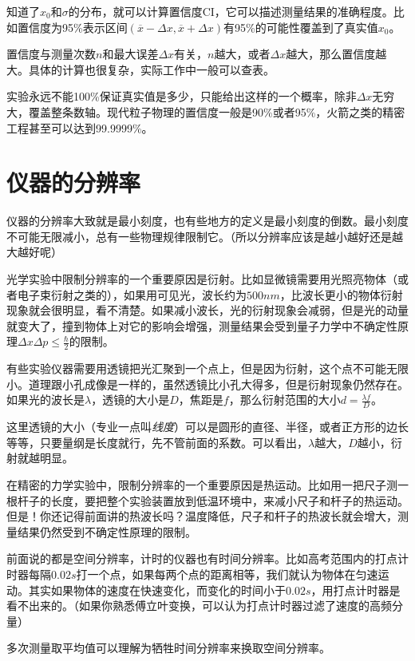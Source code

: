 知道了$x_0$和$\sigma$的分布，就可以计算置信度CI，它可以描述测量结果的准确程度。比如置信度为95\%表示区间$(\overline{x}-\Delta x,\overline{x}+\Delta x)$有95\%的可能性覆盖到了真实值$x_0$。

置信度与测量次数$n$和最大误差$\Delta x$有关，$n$越大，或者$\Delta x$越大，那么置信度越大。具体的计算也很复杂，实际工作中一般可以查表。

实验永远不能100\%保证真实值是多少，只能给出这样的一个概率，除非$\Delta x$无穷大，覆盖整条数轴。现代粒子物理的置信度一般是90\%或者95\%，火箭之类的精密工程甚至可以达到99.9999\%。
\section{仪器的分辨率}
仪器的分辨率大致就是最小刻度，也有些地方的定义是最小刻度的倒数。最小刻度不可能无限减小，总有一些物理规律限制它。（所以分辨率应该是越小越好还是越大越好呢）

光学实验中限制分辨率的一个重要原因是衍射。比如显微镜需要用光照亮物体（或者电子束衍射之类的），如果用可见光，波长约为$500 \unit{nm}$，比波长更小的物体衍射现象就会很明显，看不清楚。如果减小波长，光的衍射现象会减弱，但是光的动量就变大了，撞到物体上对它的影响会增强，测量结果会受到量子力学中不确定性原理$\Delta x \Delta p \le \frac{\hbar}{2}$的限制。

有些实验仪器需要用透镜把光汇聚到一个点上，但是因为衍射，这个点不可能无限小。道理跟小孔成像是一样的，虽然透镜比小孔大得多，但是衍射现象仍然存在。如果光的波长是$\lambda$，透镜的大小是$D$，焦距是$f$，那么衍射范围的大小$d=\frac{\lambda f}{D}$。

这里透镜的大小（专业一点叫\emph{线度}）可以是圆形的直径、半径，或者正方形的边长等等，只要量纲是长度就行，先不管前面的系数。可以看出，$\lambda$越大，$D$越小，衍射就越明显。

在精密的力学实验中，限制分辨率的一个重要原因是热运动。比如用一把尺子测一根杆子的长度，要把整个实验装置放到低温环境中，来减小尺子和杆子的热运动。但是！你还记得前面讲的热波长吗？温度降低，尺子和杆子的热波长就会增大，测量结果仍然受到不确定性原理的限制。

前面说的都是空间分辨率，计时的仪器也有时间分辨率。比如高考范围内的打点计时器每隔$0.02 \unit{s}$打一个点，如果每两个点的距离相等，我们就认为物体在匀速运动。其实如果物体的速度在快速变化，而变化的时间小于$0.02 \unit{s}$，用打点计时器是看不出来的。（如果你熟悉傅立叶变换，可以认为打点计时器过滤了速度的高频分量）

多次测量取平均值可以理解为牺牲时间分辨率来换取空间分辨率。
